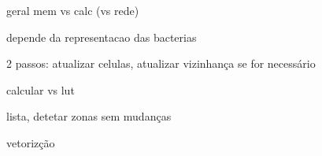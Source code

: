 geral mem vs calc (vs rede)

depende da representacao das bacterias

2 passos: atualizar celulas, atualizar vizinhança se for necessário

calcular vs lut

lista, detetar zonas sem mudanças

vetorizção 

